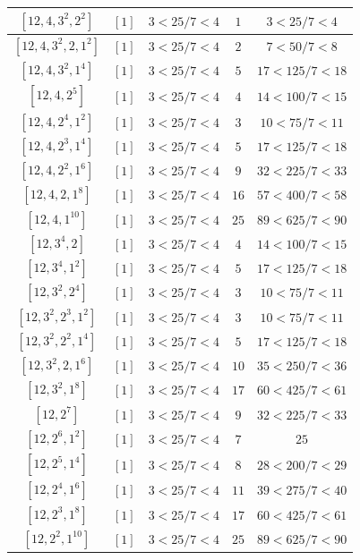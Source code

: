 \documentclass{article}%
\begin{document}
\begin{center}
\begin{longtable}{||c|c|c|c|c||}
$[12, 4, 3^{2}, 2^{2}]$ & $[1]$ & $3 < 25/7 < 4$ & $1$ & $3 < 25/7 < 4$ \\ \hline 
$[12, 4, 3^{2}, 2, 1^{2}]$ & $[1]$ & $3 < 25/7 < 4$ & $2$ & $7 < 50/7 < 8$ \\ \hline 
$[12, 4, 3^{2}, 1^{4}]$ & $[1]$ & $3 < 25/7 < 4$ & $5$ & $17 < 125/7 < 18$ \\ \hline 
$[12, 4, 2^{5}]$ & $[1]$ & $3 < 25/7 < 4$ & $4$ & $14 < 100/7 < 15$ \\ \hline 
$[12, 4, 2^{4}, 1^{2}]$ & $[1]$ & $3 < 25/7 < 4$ & $3$ & $10 < 75/7 < 11$ \\ \hline 
$[12, 4, 2^{3}, 1^{4}]$ & $[1]$ & $3 < 25/7 < 4$ & $5$ & $17 < 125/7 < 18$ \\ \hline 
$[12, 4, 2^{2}, 1^{6}]$ & $[1]$ & $3 < 25/7 < 4$ & $9$ & $32 < 225/7 < 33$ \\ \hline 
$[12, 4, 2, 1^{8}]$ & $[1]$ & $3 < 25/7 < 4$ & $16$ & $57 < 400/7 < 58$ \\ \hline 
$[12, 4, 1^{10}]$ & $[1]$ & $3 < 25/7 < 4$ & $25$ & $89 < 625/7 < 90$ \\ \hline 
$[12, 3^{4}, 2]$ & $[1]$ & $3 < 25/7 < 4$ & $4$ & $14 < 100/7 < 15$ \\ \hline 
$[12, 3^{4}, 1^{2}]$ & $[1]$ & $3 < 25/7 < 4$ & $5$ & $17 < 125/7 < 18$ \\ \hline 
$[12, 3^{2}, 2^{4}]$ & $[1]$ & $3 < 25/7 < 4$ & $3$ & $10 < 75/7 < 11$ \\ \hline 
$[12, 3^{2}, 2^{3}, 1^{2}]$ & $[1]$ & $3 < 25/7 < 4$ & $3$ & $10 < 75/7 < 11$ \\ \hline 
$[12, 3^{2}, 2^{2}, 1^{4}]$ & $[1]$ & $3 < 25/7 < 4$ & $5$ & $17 < 125/7 < 18$ \\ \hline 
$[12, 3^{2}, 2, 1^{6}]$ & $[1]$ & $3 < 25/7 < 4$ & $10$ & $35 < 250/7 < 36$ \\ \hline 
$[12, 3^{2}, 1^{8}]$ & $[1]$ & $3 < 25/7 < 4$ & $17$ & $60 < 425/7 < 61$ \\ \hline 
$[12, 2^{7}]$ & $[1]$ & $3 < 25/7 < 4$ & $9$ & $32 < 225/7 < 33$ \\ \hline 
$[12, 2^{6}, 1^{2}]$ & $[1]$ & $3 < 25/7 < 4$ & $7$ & $25$ \\ \hline 
$[12, 2^{5}, 1^{4}]$ & $[1]$ & $3 < 25/7 < 4$ & $8$ & $28 < 200/7 < 29$ \\ \hline 
$[12, 2^{4}, 1^{6}]$ & $[1]$ & $3 < 25/7 < 4$ & $11$ & $39 < 275/7 < 40$ \\ \hline 
$[12, 2^{3}, 1^{8}]$ & $[1]$ & $3 < 25/7 < 4$ & $17$ & $60 < 425/7 < 61$ \\ \hline 
$[12, 2^{2}, 1^{10}]$ & $[1]$ & $3 < 25/7 < 4$ & $25$ & $89 < 625/7 < 90$ \\ \hline 

\end{longtable}
\end{center}
\end{document}
